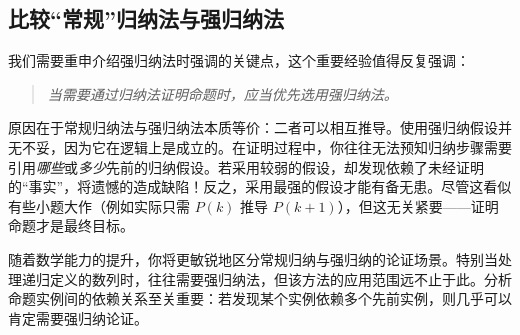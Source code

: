 \subsection{比较``常规''归纳法与强归纳法}

我们需要重申介绍强归纳法时强调的关键点，这个重要经验值得反复强调：

\begin{quotation}
    \emph{当需要通过归纳法证明命题时，应当优先选用强归纳法。}
\end{quotation}

原因在于常规归纳法与强归纳法本质等价：二者可以相互推导。使用强归纳假设并无不妥，因为它在逻辑上是成立的。在证明过程中，你往往无法预知归纳步骤需要引用\emph{哪些}或\emph{多少}先前的归纳假设。若采用较弱的假设，却发现依赖了未经证明的``事实''，将遗憾的造成缺陷！反之，采用最强的假设才能有备无患。尽管这看似有些小题大作（例如实际只需 $P(k)$ 推导 $P(k+1)$），但这无关紧要——证明命题才是最终目标。

随着数学能力的提升，你将更敏锐地区分常规归纳与强归纳的论证场景。特别当处理递归定义的数列时，往往需要强归纳法，但该方法的应用范围远不止于此。分析命题实例间的依赖关系至关重要：若发现某个实例依赖多个先前实例，则几乎可以肯定需要强归纳论证。

\clearpage